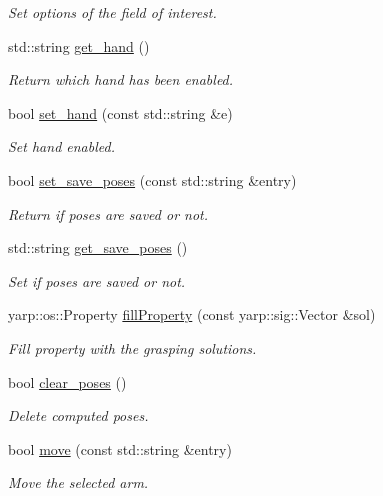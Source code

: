 \begin{DoxyCompactItemize}
\begin{DoxyCompactList}\small\item\em Set options of the field of interest. \end{DoxyCompactList}\item 
std\+::string \hyperlink{classGraspingModule_a557a87131c7396dd62c02eced7f4a937}{get\+\_\+hand} ()
\begin{DoxyCompactList}\small\item\em Return which hand has been enabled. \end{DoxyCompactList}\item 
bool \hyperlink{classGraspingModule_a9d34cb0521f86dd16648255e640eec90}{set\+\_\+hand} (const std\+::string \&e)
\begin{DoxyCompactList}\small\item\em Set hand enabled. \end{DoxyCompactList}\item 
bool \hyperlink{classGraspingModule_a618785dec349358760a05e6e4b097866}{set\+\_\+save\+\_\+poses} (const std\+::string \&entry)
\begin{DoxyCompactList}\small\item\em Return if poses are saved or not. \end{DoxyCompactList}\item 
std\+::string \hyperlink{classGraspingModule_a949e4297bdf26f564669ffc91068c4f3}{get\+\_\+save\+\_\+poses} ()
\begin{DoxyCompactList}\small\item\em Set if poses are saved or not. \end{DoxyCompactList}\item 
yarp\+::os\+::\+Property \hyperlink{classGraspingModule_a059da011f804acd1adc4549eaa3d2141}{fill\+Property} (const yarp\+::sig\+::\+Vector \&sol)
\begin{DoxyCompactList}\small\item\em Fill property with the grasping solutions. \end{DoxyCompactList}\item 
bool \hyperlink{classGraspingModule_a834e972a2a1b7b92bf8dc1e83319b028}{clear\+\_\+poses} ()
\begin{DoxyCompactList}\small\item\em Delete computed poses. \end{DoxyCompactList}\item 
bool \hyperlink{classGraspingModule_a08bd9cdbb1d16da8616c9769510e2bf1}{move} (const std\+::string \&entry)
\begin{DoxyCompactList}\small\item\em Move the selected arm. \end{DoxyCompactList}\item 

\end{DoxyCompactItemize}

